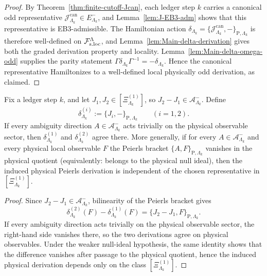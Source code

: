 \begin{proof}
By Theorem~\ref{thm:finite-cutoff-Jcan}, each ledger step \(k\) carries a canonical
odd representative \(\mathcal J^{\mathrm{can}}_{\Lambda_k}\in E^-_{\Lambda_k}\), and
Lemma~\ref{lem:J-EB3-adm} shows that this representative is EB3-admissible.  The
Hamiltonian action
\(
\delta_{\Lambda_k}=\{\mathcal J^{\mathrm{can}}_{\Lambda_k},-\}_{\mathrm P,\Lambda_k}
\)
is therefore well-defined on \(\mathcal F_{\mathrm{s.loc}}^\Lambda\), and
Lemma~\ref{lem:Main-delta-derivation} gives both the graded derivation property and
locality.  Lemma~\ref{lem:Main-delta-omega-odd} supplies the parity statement
\(
\Gamma\delta_{\Lambda_k}\Gamma^{-1}=-\delta_{\Lambda_k}
\).
Hence the canonical representative Hamiltonizes to a well-defined local physically
odd derivation, as claimed.
\end{proof}

\begin{proposition}
\label{prop:Main-physical-invariance-ambiguity}
Fix a ledger step \(k\), and let \(J_1,J_2\in[\Xi^{(1)}_{\Lambda_k}]\), so
\(J_2-J_1\in\mathcal A^-_{\Lambda_k}\). Define
\[
\delta^{(i)}_{\Lambda_k}:=\{J_i,-\}_{\mathrm P,\Lambda_k}
\qquad (i=1,2).
\]
If every ambiguity direction \(A\in\mathcal A^-_{\Lambda_k}\) acts trivially on the
physical observable sector, then \(\delta^{(1)}_{\Lambda_k}\) and
\(\delta^{(2)}_{\Lambda_k}\) agree there. More generally, if for every
\(A\in\mathcal A^-_{\Lambda_k}\) and every physical local observable \(F\) the
Peierls bracket \(\{A,F\}_{\mathrm P,\Lambda_k}\) vanishes in the physical quotient
\textnormal{(equivalently: belongs to the physical null ideal)}, then the induced
physical Peierls derivation is independent of the chosen representative in
\([\Xi^{(1)}_{\Lambda_k}]\).
\end{proposition}

\begin{proof}
Since \(J_2-J_1\in\mathcal A^-_{\Lambda_k}\), bilinearity of the Peierls bracket gives
\[
\delta^{(2)}_{\Lambda_k}(F)-\delta^{(1)}_{\Lambda_k}(F)
=\{J_2-J_1,F\}_{\mathrm P,\Lambda_k}.
\]
If every ambiguity direction acts trivially on the physical observable sector, the
right-hand side vanishes there, so the two derivations agree on physical observables.
Under the weaker null-ideal hypothesis, the same identity shows that the difference
vanishes after passage to the physical quotient, hence the induced physical derivation
depends only on the class \([\Xi^{(1)}_{\Lambda_k}]\).
\end{proof}

